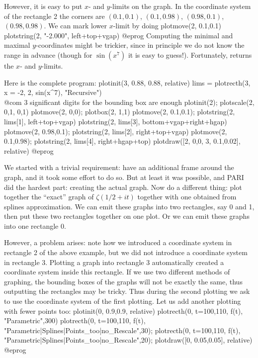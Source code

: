 However, it is easy to put $x$- and $y$-limits on the graph.  In the
coordinate system of the rectangle 2 the corners are $(0.1,0.1)$,
$(0.1,0.98)$, $(0.98,0.1)$, $(0.98,0.98)$.  We can mark lower $x$-limit by
doing
\bprog
  plotmove(2, 0.1,0.1)
  plotstring(2, "-2.000", left+top+vgap)
@eprog\noindent
Computing the minimal and maximal $y$-coordinates might be trickier, since
in principle we do not know the range in advance (though for $\sin(x^7)$ it
is easy to guess!). Fortunately,  returns the $x$- and
$y$-limits.

Here is the complete program:
\bprog
  plotinit(3, 0.88, 0.88, relative)
  lims = plotrecth(3, x = -2, 2, sin(x^7), "Recursive")
            \\ @com $3$ significant digits for the bounding box are enough
  plotinit(2);      plotscale(2, 0,1, 0,1)
  plotmove(2, 0,0); plotbox(2, 1,1)
  plotmove(2, 0.1,0.1);
  plotstring(2, lims[1], left+top+vgap)
  plotstring(2, lims[3], bottom+vgap+right+hgap)
  plotmove(2, 0.98,0.1); plotstring(2, lims[2], right+top+vgap)
  plotmove(2, 0.1,0.98); plotstring(2, lims[4], right+hgap+top)
  plotdraw([2, 0,0,  3, 0.1,0.02], relative)
@eprog

We started with a trivial requirement: have an additional frame around
the graph, and it took some effort to do so.  But at least it was possible,
and PARI did the hardest part: creating the actual graph.
Now do a different thing: plot together the ``exact'' graph of
$\zeta({1/2}+it)$ together with one obtained from splines approximation.
We can emit these graphs into two rectangles, say 0 and 1, then put these
two rectangles together on one plot.  Or we can emit these graphs into one
rectangle 0.

However, a problem arises: note how we
introduced a coordinate system in rectangle 2 of the above example, but we
did not introduce a coordinate system in rectangle 3.  Plotting a
graph into rectangle 3 automatically created a coordinate system
inside this rectangle.  If we use two different
methods of graphing, the bounding boxes of the graphs will not be exactly
the same, thus outputting the rectangles may be tricky.  Thus during
the second plotting we ask  to use the coordinate system of
the first plotting.  Let us add another plotting with fewer
points too:
\bprog
plotinit(0, 0.9,0.9, relative)
plotrecth(0, t=100,110, f(t), "Parametric",300)
plotrecth(0, t=100,110, f(t), "Parametric|Splines|Points_too|no_Rescale",30);
plotrecth(0, t=100,110, f(t), "Parametric|Splines|Points_too|no_Rescale",20);
plotdraw([0, 0.05,0.05], relative)
@eprog

